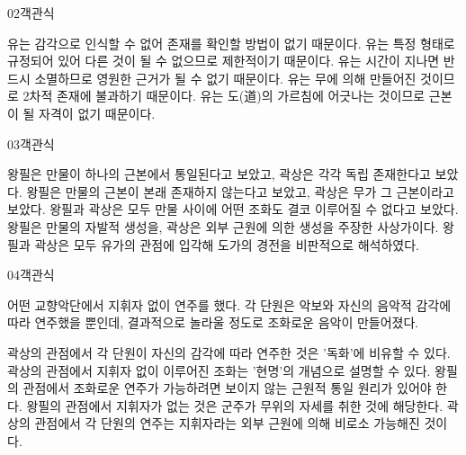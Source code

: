 \documentclass[fs85,seriesWit]{korfarm-base}
\begin{document}
\begin{kfQBlock}{02}{객관식}
\begin{kfChoices}
\kfChoice 유는 감각으로 인식할 수 없어 존재를 확인할 방법이 없기 때문이다.
\kfChoice 유는 특정 형태로 규정되어 있어 다른 것이 될 수 없으므로 제한적이기 때문이다.
\kfChoice 유는 시간이 지나면 반드시 소멸하므로 영원한 근거가 될 수 없기 때문이다.
\kfChoice 유는 무에 의해 만들어진 것이므로 2차적 존재에 불과하기 때문이다.
\kfChoice 유는 도(道)의 가르침에 어긋나는 것이므로 근본이 될 자격이 없기 때문이다.
\end{kfChoices}
\end{kfQBlock}

\begin{kfQBlock}{03}{객관식}
\begin{kfChoices}
\kfChoice 왕필은 만물이 하나의 근본에서 통일된다고 보았고, 곽상은 각각 독립 존재한다고 보았다.
\kfChoice 왕필은 만물의 근본이 본래 존재하지 않는다고 보았고, 곽상은 무가 그 근본이라고 보았다.
\kfChoice 왕필과 곽상은 모두 만물 사이에 어떤 조화도 결코 이루어질 수 없다고 보았다.
\kfChoice 왕필은 만물의 자발적 생성을, 곽상은 외부 근원에 의한 생성을 주장한 사상가이다.
\kfChoice 왕필과 곽상은 모두 유가의 관점에 입각해 도가의 경전을 비판적으로 해석하였다.
\end{kfChoices}
\end{kfQBlock}

\begin{kfQBlock}{04}{객관식}
\begin{kfEvidence}어떤 교향악단에서 지휘자 없이 연주를 했다. 각 단원은 악보와 자신의 음악적 감각에 따라 연주했을 뿐인데, 결과적으로 놀라울 정도로 조화로운 음악이 만들어졌다.\end{kfEvidence}
\begin{kfChoices}
\kfChoice 곽상의 관점에서 각 단원이 자신의 감각에 따라 연주한 것은 '독화'에 비유할 수 있다.
\kfChoice 곽상의 관점에서 지휘자 없이 이루어진 조화는 '현명'의 개념으로 설명할 수 있다.
\kfChoice 왕필의 관점에서 조화로운 연주가 가능하려면 보이지 않는 근원적 통일 원리가 있어야 한다.
\kfChoice 왕필의 관점에서 지휘자가 없는 것은 군주가 무위의 자세를 취한 것에 해당한다.
\kfChoice 곽상의 관점에서 각 단원의 연주는 지휘자라는 외부 근원에 의해 비로소 가능해진 것이다.
\end{kfChoices}
\end{kfQBlock}
\end{document}
